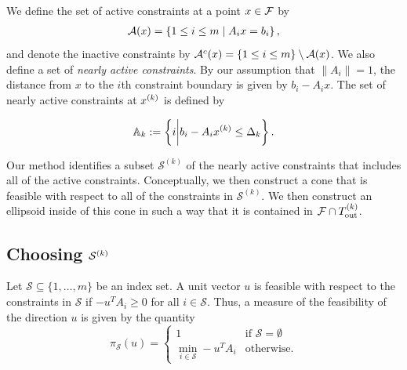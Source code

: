\documentclass{article}
\begin{document}
We define the set of active constraints at a point $x \in {\mathcal F}$ by
\begin{align}
{\mathcal A}(x) = \left\{1 \le i \le m \; | \; {{A}}_ix = {{b}}_i \right\},\label{define_activei}
\end{align}
and denote the inactive constraints by ${\mathcal A}^c(x) = \left\{1 \le i \le m\right\} \setminus {\mathcal A}(x)$.   We also define a set of {\em nearly active constraints}.   By our assumption that $\|A_i\|=1$, the distance from $x$ to the $i$th constraint boundary is given by $b_i-A_i x$.  The set of nearly active constraints at $x^{(k)}$ is defined by

%
%
\begin{align}
{\mathbb A_{k}} := \left\{i \bigg| b_i-A_i x^{(k)} \le \Delta_k \right\}.
\label{define_activeconstraints}
\end{align}

Our method identifies a subset $\mathcal{S}^{(k)}$ of the nearly active constraints that includes all of the active constraints.   Conceptually,  we then construct a cone that is feasible with respect to all of the constraints in $\mathcal{S}^{(k)}$.   We then
construct an ellipsoid inside of this cone in such a way that it is contained in ${\mathcal F} \cap {T_{\text{out}}^{(k)}}$.  

\subsection{Choosing $\mathcal{S}^{(k)}$}
\label{Choosing_activeconstraints}

Let $\mathcal{S} \subseteq \{1, \ldots,m\}$ be an  index set.    A unit vector $u$ is feasible with respect to the constraints in $\mathcal{S}$ if $-u^T A_i \ge 0$ for all $i \in \mathcal{S}$.   Thus,   a measure of the feasibility of the direction $u$ is given by the quantity 
\begin{equation}\label{define_feasibility_measure}
\pi_{\mathcal S}(u) = \left\{\begin{array}{ll} 1& \mbox{if } \mathcal S = \emptyset \\
\min_{i \in \mathcal S} -u^T A_i & \mbox{otherwise.}
\end{array} \right.
\end{equation}
\end{document}

